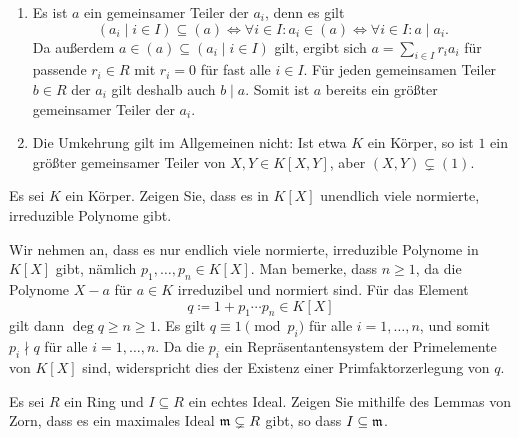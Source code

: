 \begin{question}
  \begin{enumerate}
    \item
      Es ist $a$ ein gemeinsamer Teiler der $a_i$, denn es gilt
      \[
              (a_i \mid i \in I) \subseteq (a)
        \iff  \forall i \in I: a_i \in (a)
        \iff  \forall i \in I: a \mid a_i.
      \]
      Da außerdem $a \in (a) \subseteq (a_i \mid i \in I)$ gilt, ergibt sich $a = \sum_{i \in I} r_i a_i$ für passende $r_i \in R$ mit $r_i = 0$ für fast alle $i \in I$.
      Für jeden gemeinsamen Teiler $b \in R$ der $a_i$ gilt deshalb auch $b \mid a$.
      Somit ist $a$ bereits ein größter gemeinsamer Teiler der $a_i$.
    \item
      Die Umkehrung gilt im Allgemeinen nicht:
      Ist etwa $K$ ein Körper, so ist $1$ ein größter gemeinsamer Teiler von $X, Y \in K[X, Y]$, aber $(X, Y) \subsetneq (1)$.
  \end{enumerate}
\end{question}


\begin{question}[subtitle = Euklid]
  Es sei $K$ ein Körper.
  Zeigen Sie, dass es in $K[X]$ unendlich viele normierte, irreduzible Polynome gibt.
\end{question}


\begin{solution}
  Wir nehmen an, dass es nur endlich viele normierte, irreduzible Polynome in $K[X]$ gibt, nämlich $p_1, \dotsc, p_n \in K[X]$.
  Man bemerke, dass $n \geq 1$, da die Polynome $X - a$ für $a \in K$ irreduzibel und normiert sind.
  Für das Element
  \[
    q \coloneqq 1 + p_1 \dotsm p_n \in K[X]
  \]
  gilt dann $\deg q \geq n \geq 1$.
  Es gilt $q \equiv 1 \pmod{p_i}$ für alle $i = 1, \dotsc, n$, und somit $p_i \nmid q$ für alle $i = 1, \dotsc, n$.
  Da die $p_i$ ein Repräsentantensystem der Primelemente von $K[X]$ sind, widerspricht dies der Existenz einer Primfaktorzerlegung von $q$.
\end{solution}


\begin{question}[subtitle = Zur Existenz von maximalen Idealen]
  Es sei $R$ ein Ring und $I \subseteq R$ ein echtes Ideal.
  Zeigen Sie mithilfe des Lemmas von Zorn, dass es ein maximales Ideal $\mathfrak{m} \subsetneq R$ gibt, so dass $I \subseteq \mathfrak{m}$.
\end{question}


